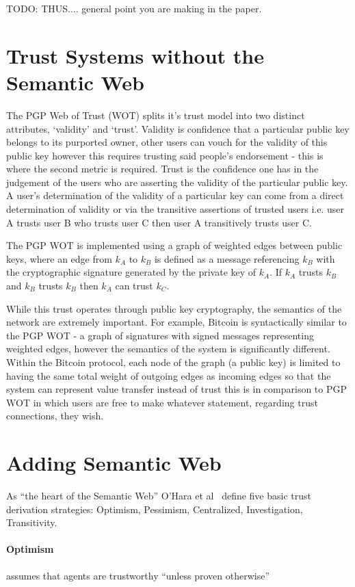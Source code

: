 \documentclass{acm_proc_article-sp}
\begin{document}
TODO: THUS.... general point you are making in the paper.

\section{Trust Systems without the Semantic Web}
The PGP Web of Trust (WOT)\cite{_how_pgp_1999} splits it's trust model into two distinct attributes, `validity' and `trust'.   Validity is confidence that a particular public key belongs to its purported owner, other users can vouch for the validity of this public key however this requires trusting said people's endorsement - this is where the second metric is required.  Trust is the confidence one has in the judgement of the users who are asserting the validity of the particular public key.  A user's determination of the validity of a particular key can come from a direct determination of validity or via the transitive assertions of trusted users i.e. user A trusts user B who trusts user C then user A transitively trusts user C.

The PGP WOT is implemented using a graph of weighted edges between public keys, where an edge from $k_A$ to $k_B$ is defined as a message referencing $k_B$ with the cryptographic signature generated by the private key of $k_A$. If $k_A$ trusts $k_B$ and $k_B$ trusts $k_B$ then $k_A$ can trust $k_C$.

While this trust operates through public key cryptography, the semantics of the network are extremely important.  For example, Bitcoin is syntactically similar to the PGP WOT - a graph of signatures with signed messages representing weighted edges, however the semantics of the system is significantly different\cite{bitcoin}.  Within the Bitcoin protocol, each node of the graph (a public key) is limited to having the same total weight of outgoing edges as incoming edges so that the system can represent value transfer instead of trust this is in comparison to PGP WOT in which users are free to make whatever statement, regarding trust connections, they wish.

\section{Adding Semantic Web}
As ``the heart of the Semantic Web'' O'Hara et al~\cite{ohara_trust_2004} define five basic trust derivation strategies: Optimism, Pessimism, Centralized, Investigation, Transitivity.

\paragraph{Optimism} assumes that agents are trustworthy ``unless proven otherwise''
\end{document}
